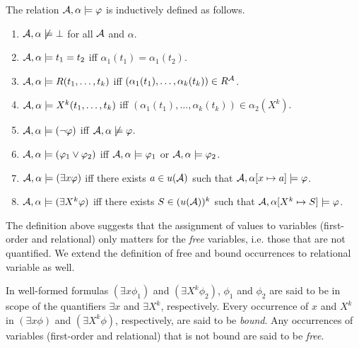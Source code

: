 \documentclass[11pt,twoside=off,numbers=noenddot]{scrbook}
\begin{document}
\begin{definition}
  The relation $\mathcal{A}, \alpha \models \varphi$ is inductively defined as follows.
  \begin{enumerate}
    \item $\mathcal{A}, \alpha \not\models \bot$ for all $\mathcal{A}$ and $\alpha$.
    \item $\mathcal{A}, \alpha \models t_1 = t_2$ iff $\alpha_1(t_1) =
      \alpha_1(t_2)$.
    \item $\mathcal{A}, \alpha \models R(t_1, \dots, t_k)$ iff
      $(\alpha_1(t_1), \dots, \alpha_k(t_k)) \in R^{\mathcal{A}}$.
    \item $\mathcal{A}, \alpha \models X^k(t_1, \dots, t_k)$ iff
      $(\alpha_1(t_1), \dots, \alpha_k(t_k)) \in \alpha_2(X^k)$.
    \item $\mathcal{A}, \alpha \models (\neg \varphi)$ iff $\mathcal{A}, \alpha
      \not\models \varphi$.
    \item $\mathcal{A}, \alpha \models (\varphi_1 \vee \varphi_2)$ iff
      $\mathcal{A}, \alpha \models \varphi_1$ or $\mathcal{A}, \alpha \models \varphi_2$.
    \item $\mathcal{A}, \alpha \models (\exists x \varphi)$ iff there exists
      $a \in u(\mathcal{A})$ such that $\mathcal{A}, \alpha[x \mapsto a] \models \varphi$.
    \item $\mathcal{A}, \alpha \models (\exists X^k \varphi)$ iff there
      exists $S \in (u(\mathcal{A}))^k$ such that $\mathcal{A}, \alpha[X^k
      \mapsto S] \models \varphi$.
  \end{enumerate}
\end{definition}

The definition above suggests that the assignment of values to
variables (first-order and relational) only matters for the
\emph{free} variables, i.e. those that are not quantified. We extend
the definition of free and bound occurrences to relational variable as well.

\begin{definition}
  In well-formed formulas $(\exists x \phi_1)$ and $(\exists X^k
  \phi_2)$, $\phi_1$ and $\phi_2$ are said to be in scope of the
  quantifiers $\exists x$ and $\exists X^k$, respectively. Every
  occurrence of $x$ and $X^k$ in $(\exists x \phi)$ and $(\exists X^k
  \phi)$, respectively, are said to be \emph{bound}. Any occurrences
  of variables (first-order and relational) that is not bound are
  said to be \emph{free}.
\end{definition}
\end{document}
